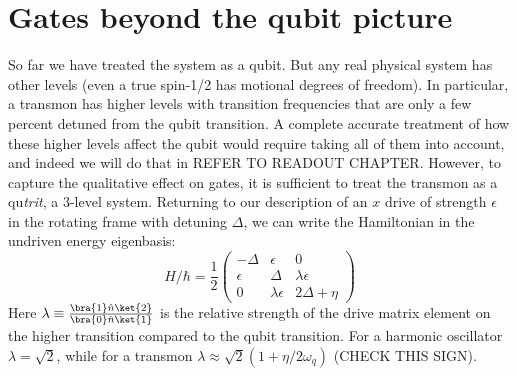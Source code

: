 
\section{Gates beyond the qubit picture}\label{sec:beyondqubitgates}
So far we have treated the system as a qubit. But any real physical system has other levels (even a true spin-1/2 has motional degrees of freedom). In particular, a transmon has higher levels with transition frequencies that are only a few percent detuned from the qubit transition. A complete accurate treatment of how these higher levels affect the qubit would require taking all of them into account, and indeed we will do that in REFER TO READOUT CHAPTER. However, to capture the qualitative effect on gates, it is sufficient to treat the transmon as a qu\textit{trit}, a 3-level system. Returning to our description of an $x$ drive of strength $\epsilon$ in the rotating frame with detuning $\Delta$, we can write the Hamiltonian in the undriven energy eigenbasis:
\begin{equation*}
    \hat{H}/\hbar = \frac{1}{2}\begin{pmatrix}
        -\Delta & \epsilon & 0 \\ 
        \epsilon & \Delta & \lambda\epsilon \\
        0 & \lambda \epsilon & 2 \Delta + \eta
    \end{pmatrix}
\end{equation*}
Here $\lambda \equiv \frac{\bra{1}\hat{n}\ket{2}}{\bra{0}\hat{n}\ket{1}}$ is the relative strength of the drive matrix element on the higher transition compared to the qubit transition. For a harmonic oscillator $\lambda = \sqrt{2}$, while for a transmon $\lambda\approx\sqrt{2}(1+\eta/2\omega_q)$ (CHECK THIS SIGN).

